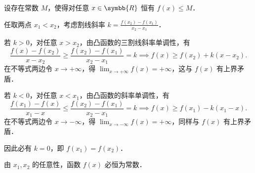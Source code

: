 \begin{myproof}
    设存在常数 $M$，使得对任意 $x \in \symbb{R}$ 恒有 $f(x) \leqslant M$．

    任取两点 $x_1 < x_2$，考虑割线斜率 $k = \frac{f(x_2) - f(x_1)}{x_2 - x_1}$．

    若 $k > 0$，对任意 $x > x_2$，由凸函数的三割线斜率单调性，有
    \begin{equation}
        \frac{f(x) - f(x_2)}{x - x_2} \geqslant \frac{f(x_2) - f(x_1)}{x_2 - x_1} = k \implies f(x) \geqslant f(x_2) + k(x - x_2).
    \end{equation}
    在不等式两边令 $x \to +\infty$，得 $\lim_{x\to +\infty} f(x) = +\infty$，这与 $f(x)$ 有上界矛盾．

    若 $k < 0$，对任意 $x < x_1$，由凸函数的斜率单调性，有
    \begin{equation}
        \frac{f(x_1) - f(x)}{x_1 - x} \leqslant \frac{f(x_2) - f(x_1)}{x_2 - x_1} = k \implies f(x) \geqslant f(x_1) - k(x_1 - x).
    \end{equation}
    在不等式两边令 $x \to -\infty$，得 $\lim_{x\to -\infty} f(x) = +\infty$，同样与 $f(x)$ 有上界矛盾．

    因此必有 $k = 0$，即 $f(x_1) = f(x_2)$．

    由 $x_1, x_2$ 的任意性，函数 $f(x)$ 必恒为常数．
\end{myproof}

\endinput
